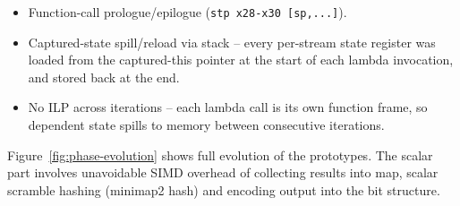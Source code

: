\begin{itemize}
\item Function-call prologue/epilogue (\texttt{stp x28-x30 [sp,...]}).
\item Captured-state spill/reload via stack -- every per-stream
  state register was loaded from the captured-this pointer at
  the start of each lambda invocation, and stored back at the
  end.
\item No ILP across iterations -- each lambda call is its own
  function frame, so dependent state spills to memory between
  consecutive iterations.
\end{itemize}

Figure~\ref{fig:phase-evolution} shows full evolution of the prototypes. The scalar part involves unavoidable SIMD overhead of collecting results into map, scalar scramble hashing (minimap2 hash) and encoding output into the bit structure.


